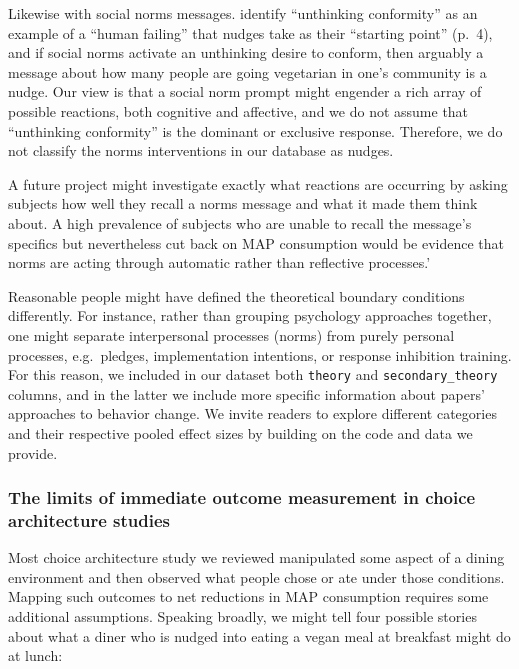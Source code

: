 \documentclass[sn-nature,referee,pdflatex]{sn-jnl}
\begin{document}
Likewise with social norms messages. \citep{mols2015} identify
``unthinking conformity'' as an example of a ``human failing'' that
nudges take as their ``starting point'' (p.~4), and if social norms
activate an unthinking desire to conform, then arguably a message about
how many people are going vegetarian in one's community is a nudge. Our
view is that a social norm prompt might engender a rich array of
possible reactions, both cognitive and affective, and we do not assume
that ``unthinking conformity'' is the dominant or exclusive response.
Therefore, we do not classify the norms interventions in our database as
nudges.

A future project might investigate exactly what reactions are occurring
by asking subjects how well they recall a norms message and what it made
them think about. A high prevalence of subjects who are unable to recall
the message's specifics but nevertheless cut back on MAP consumption
would be evidence that norms are acting through automatic rather than
reflective processes.'

Reasonable people might have defined the theoretical boundary conditions
differently. For instance, rather than grouping psychology approaches
together, one might separate interpersonal processes (norms) from purely
personal processes, e.g.~pledges, implementation intentions, or response
inhibition training. For this reason, we included in our dataset both
\texttt{theory} and \texttt{secondary\_theory} columns, and in the
latter we include more specific information about papers' approaches to
behavior change. We invite readers to explore different categories and
their respective pooled effect sizes by building on the code and data we
provide.

\subsubsection{The limits of immediate outcome measurement in choice
architecture
studies}\label{the-limits-of-immediate-outcome-measurement-in-choice-architecture-studies}

Most choice architecture study we reviewed manipulated some aspect of a
dining environment and then observed what people chose or ate under
those conditions. Mapping such outcomes to net reductions in MAP
consumption requires some additional assumptions. Speaking broadly, we
might tell four possible stories about what a diner who is nudged into
eating a vegan meal at breakfast might do at lunch:
\end{document}
